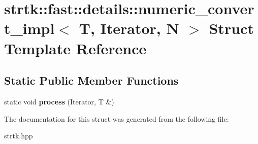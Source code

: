 \hypertarget{structstrtk_1_1fast_1_1details_1_1numeric__convert__impl}{\section{strtk\-:\-:fast\-:\-:details\-:\-:numeric\-\_\-convert\-\_\-impl$<$ T, Iterator, N $>$ Struct Template Reference}
\label{structstrtk_1_1fast_1_1details_1_1numeric__convert__impl}
}
\subsection*{Static Public Member Functions}
\begin{DoxyCompactItemize}
\item 
\hypertarget{structstrtk_1_1fast_1_1details_1_1numeric__convert__impl_a228f7de8899333f70634c3e5226012d7}{static void {\bfseries process} (Iterator, T \&)}\label{structstrtk_1_1fast_1_1details_1_1numeric__convert__impl_a228f7de8899333f70634c3e5226012d7}

\end{DoxyCompactItemize}


The documentation for this struct was generated from the following file\-:\begin{DoxyCompactItemize}
\item 
strtk.\-hpp\end{DoxyCompactItemize}
